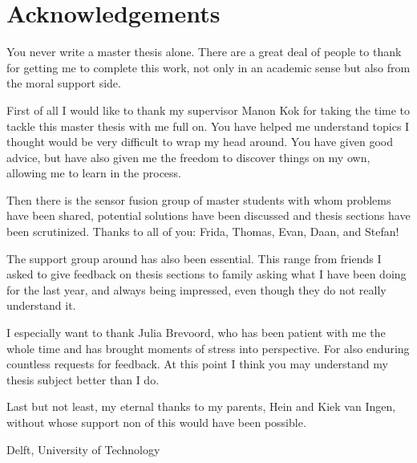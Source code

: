 %
\chapter{Acknowledgements}%

You never write a master thesis alone. There are a great deal of people to thank for getting me to complete this work, not only in an academic sense but also from the moral support side.\par 

First of all I would like to thank my supervisor Manon Kok for taking the time to tackle this master thesis with me full on. You have helped me understand topics I thought would be very difficult to wrap my head around. You have given good advice, but have also given me the freedom to discover things on my own, allowing me to learn in the process. \par 

Then there is the sensor fusion group of master students with whom problems have been shared, potential solutions have been discussed and thesis sections have been scrutinized. Thanks to all of you: Frida, Thomas, Evan, Daan, and Stefan!

The support group around has also been essential. This range from friends I asked to give feedback on thesis sections to family asking what I have been doing for the last year, and always being impressed, even though they do not really understand it.

I especially want to thank Julia Brevoord, who has been patient with me the whole time and has brought moments of stress into perspective. For also enduring countless requests for feedback. At this point I think you may understand my thesis subject better than I do.

Last but not least, my eternal thanks to my parents, Hein and Kiek van Ingen, without whose support non of this would have been possible.



\vspace*{15mm}

Delft, University of Technology \hfill \mscname \\
\mscdate